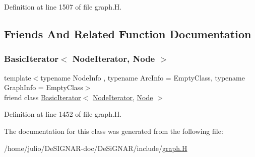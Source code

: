 Definition at line 1507 of file graph.\+H.



\subsection{Friends And Related Function Documentation}
\mbox{\label{class_designar_1_1_graph_1_1_node_iterator_a21dc6ae614d097ff896e9e8e422d8f3c}} 
\subsubsection{\texorpdfstring{Basic\+Iterator$<$ Node\+Iterator, Node $>$}{BasicIterator< NodeIterator, Node >}}
{\footnotesize\ttfamily template$<$typename Node\+Info , typename Arc\+Info  = Empty\+Class, typename Graph\+Info  = Empty\+Class$>$ \\
friend class \hyperlink{class_designar_1_1_basic_iterator}{Basic\+Iterator}$<$ \hyperlink{class_designar_1_1_graph_1_1_node_iterator}{Node\+Iterator}, \hyperlink{class_designar_1_1_graph_a5dfc7dba9d092ac489c72e40390c37d0}{Node} $>$\hspace{0.3cm}{\ttfamily [friend]}}



Definition at line 1452 of file graph.\+H.



The documentation for this class was generated from the following file\+:\begin{DoxyCompactItemize}
\item 
/home/julio/\+De\+S\+I\+G\+N\+A\+R-\/doc/\+De\+Si\+G\+N\+A\+R/include/\hyperlink{graph_8_h}{graph.\+H}\end{DoxyCompactItemize}

